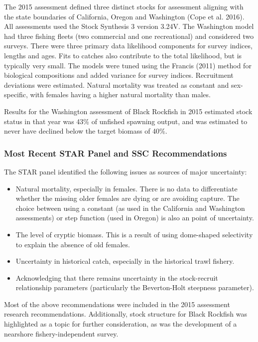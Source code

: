 \documentclass[11pt,
  letterpaper,
]{article}
\providecommand{\tightlist}{%
  \setlength{\itemsep}{0pt}\setlength{\parskip}{0pt}}
\providecommand{\tightlist}{%
  \setlength{\itemsep}{0pt}\setlength{\parskip}{0pt}}
\begin{document}
The 2015 assessment defined three distinct stocks for assessment aligning with the state boundaries of California, Oregon and Washington (Cope et al. 2016). All assessments used the Stock Synthesis 3 version 3.24V. The Washington model had three fishing fleets (two commercial and one recreational) and considered two surveys. There were three primary data likelihood components for survey indices, lengths and ages. Fits to catches also contribute to the total likelihood, but is typically very small. The models were tuned using the Francis (2011) method for biological compositions and added variance for survey indices. Recruitment deviations were estimated. Natural mortality was treated as constant and sex-specific, with females having a higher natural mortality than males.

Results for the Washington assessment of Black Rockfish in 2015 estimated stock status in that year was 43\% of unfished spawning output, and was estimated to never have declined below the target biomass of 40\%.

\hypertarget{most-recent-star-panel-and-ssc-recommendations}{%
\subsubsection{Most Recent STAR Panel and SSC Recommendations}\label{most-recent-star-panel-and-ssc-recommendations}}

The STAR panel identified the following issues as sources of major uncertainty:

\begin{itemize}
\tightlist
\item
  Natural mortality, especially in females. There is no data to differentiate whether the missing older females are dying or are avoiding capture. The choice between using a constant (as used in the California and Washington assessments) or step function (used in Oregon) is also an point of uncertainty.
\item
  The level of cryptic biomass. This is a result of using dome-shaped selectivity to explain the absence of old females.
\item
  Uncertainty in historical catch, especially in the historical trawl fishery.
\item
  Acknowledging that there remains uncertainty in the stock-recruit relationship parameters (particularly the Beverton-Holt steepness parameter).
\end{itemize}

Most of the above recommendations were included in the 2015 assessment research recommendations. Additionally, stock structure for Black Rockfish was highlighted as a topic for further consideration, as was the development of a nearshore fishery-independent survey.
\end{document}
